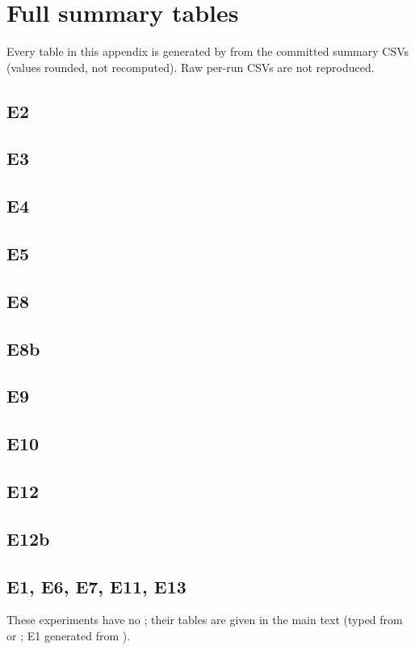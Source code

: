 \chapter{Full summary tables}\label{app:tables}
\setlength{\tabcolsep}{3pt}
Every table in this appendix is generated by  from the
committed summary CSVs (values rounded, not recomputed). Raw per-run CSVs are not reproduced.

\section{E2}
\section{E3}
\section{E4}
\section{E5}
\section{E8}
\section{E8b}
\section{E9}
\section{E10}
\section{E12}
\section{E12b}
\section{E1, E6, E7, E11, E13}
These experiments have no ; their tables are given in the main text (typed from
 or ; E1 generated from
).
